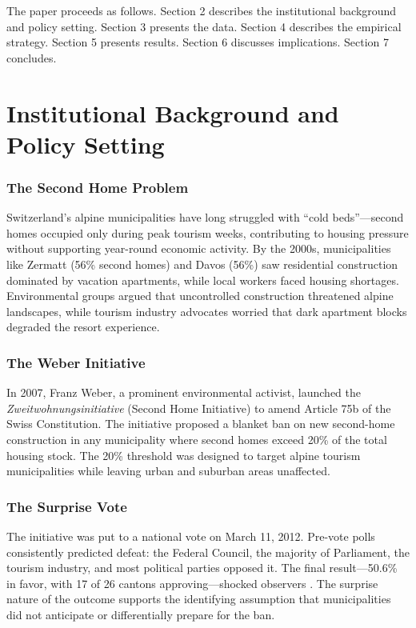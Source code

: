 \documentclass[12pt]{article}
\begin{document}
The paper proceeds as follows. Section 2 describes the institutional background and policy setting. Section 3 presents the data. Section 4 describes the empirical strategy. Section 5 presents results. Section 6 discusses implications. Section 7 concludes.

\section{Institutional Background and Policy Setting}

\subsubsection*{The Second Home Problem} Switzerland's alpine municipalities have long struggled with ``cold beds''---second homes occupied only during peak tourism weeks, contributing to housing pressure without supporting year-round economic activity. By the 2000s, municipalities like Zermatt (56\% second homes) and Davos (56\%) saw residential construction dominated by vacation apartments, while local workers faced housing shortages. Environmental groups argued that uncontrolled construction threatened alpine landscapes, while tourism industry advocates worried that dark apartment blocks degraded the resort experience.

\subsubsection*{The Weber Initiative} In 2007, Franz Weber, a prominent environmental activist, launched the \textit{Zweitwohnungsinitiative} (Second Home Initiative) to amend Article 75b of the Swiss Constitution. The initiative proposed a blanket ban on new second-home construction in any municipality where second homes exceed 20\% of the total housing stock. The 20\% threshold was designed to target alpine tourism municipalities while leaving urban and suburban areas unaffected.

\subsubsection*{The Surprise Vote} The initiative was put to a national vote on March 11, 2012. Pre-vote polls consistently predicted defeat: the Federal Council, the majority of Parliament, the tourism industry, and most political parties opposed it. The final result---50.6\% in favor, with 17 of 26 cantons approving---shocked observers \citep{brunetti2015}. The surprise nature of the outcome supports the identifying assumption that municipalities did not anticipate or differentially prepare for the ban.
\end{document}
